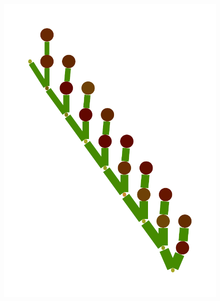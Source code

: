 \documentclass[a4paper,10pt]{article}
\begin{document}
\begin{figure}
{    \includegraphics[scale=.14]{../figures/vector/6-4-vine-induced-7.pdf}
}
\end{figure}
\end{document}
